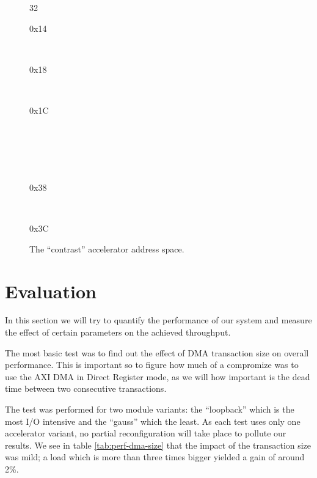 \begin{figure}[tb]
{\begin{bytefield}[rightcurly=.,bitwidth=1.1em,endianness=big,bitformatting=\footnotesize\ttfamily,
	boxformatting={\centering\ttfamily},bitwidth=0.75em]{32}
\begin{rightwordgroup}{0x14}
\end{rightwordgroup}\\
\begin{rightwordgroup}{0x18}
\end{rightwordgroup}\\
\begin{rightwordgroup}{0x1C}
\end{rightwordgroup}\\
 \\
\skippedwords \\
 \\
\begin{rightwordgroup}{0x38}
\end{rightwordgroup}\\
\begin{rightwordgroup}{0x3C}
\end{rightwordgroup}
\end{bytefield}
}
\caption{The ``contrast'' accelerator address space.}
\label{fig:hls-map}
\end{figure}

\section{Evaluation}

In this section we will try to quantify the performance of our system and measure the effect
of certain parameters on the achieved throughput.

The most basic test was to find out the effect of DMA transaction size on overall performance.
This is important so to figure how much of a compromize was to use the AXI DMA in Direct Register mode,
as we will how important is the dead time between two consecutive transactions.

The test was performed for two module variants: the ``loopback'' which is the most I/O intensive and the ``gauss'' which the least.
As each test uses only one accelerator variant, no partial reconfiguration will take place to pollute our results.
We see in table \ref{tab:perf-dma-size} that the impact of the transaction size was mild; a load which
is more than three times bigger yielded a gain of around 2\%. 

